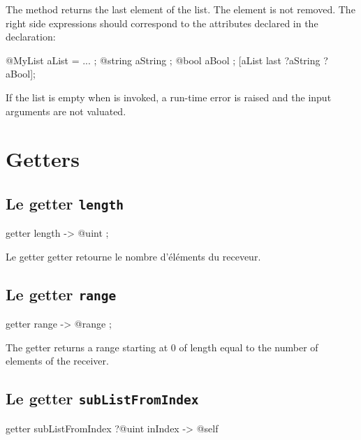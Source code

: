 The  method returns the last element of the list. The element is not removed. The right side expressions should correspond to the attributes declared in the  declaration:\\

\begin{galgascode}
@MyList aList = ... ;
@string aString ;
@bool aBool ;
[aList last ?aString ?aBool];
\end{galgascode}


If the list is empty when  is invoked, a run-time error is raised and the input arguments are not valuated.








\section{Getters}

\subsection{Le getter \texttt{length}}

\begin{galgascode}
getter length -> @uint ;
\end{galgascode}

Le getter  getter retourne le nombre d'éléments du receveur.


\subsection{Le getter \texttt{range}}

\begin{galgascode}
getter range -> @range ;
\end{galgascode}

The  getter returns a range starting at $0$ of length equal to the number of elements of the receiver.




\subsection{Le getter \texttt{subListFromIndex}}

\begin{galgascode}
getter subListFromIndex ?@uint inIndex -> @self
\end{galgascode}

